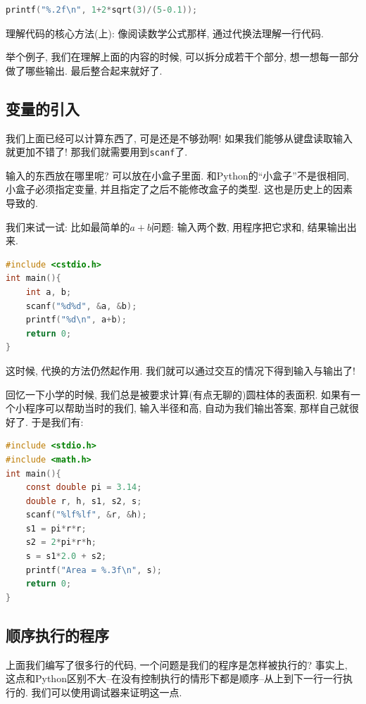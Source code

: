 \begin{lstlisting}[language=c]
	printf("%.2f\n", 1+2*sqrt(3)/(5-0.1)); 
\end{lstlisting}


\begin{idea}
	理解代码的核心方法(上): 像阅读数学公式那样, 通过代换法理解一行代码. 
	
	举个例子, 我们在理解上面的内容的时候, 可以拆分成若干个部分, 想一想每一部分做了哪些输出. 最后整合起来就好了. 
	
\end{idea}

\subsection{变量的引入}

我们上面已经可以计算东西了, 可是还是不够劲啊! 如果我们能够从键盘读取输入就更加不错了! 那我们就需要用到\texttt{scanf}了. 

输入的东西放在哪里呢? 可以放在小盒子里面. 和Python的``小盒子''不是很相同, 小盒子必须指定变量, 并且指定了之后不能修改盒子的类型. 这也是历史上的因素导致的. 

我们来试一试: 比如最简单的$a+b$问题: 输入两个数, 用程序把它求和, 结果输出出来. 

\begin{lstlisting}[language=c]
#include <cstdio.h>
int main(){
	int a, b;
	scanf("%d%d", &a, &b);
	printf("%d\n", a+b);
	return 0;
}
\end{lstlisting} 

这时候, 代换的方法仍然起作用. 我们就可以通过交互的情况下得到输入与输出了! 

回忆一下小学的时候, 我们总是被要求计算(有点无聊的)圆柱体的表面积. 如果有一个小程序可以帮助当时的我们, 输入半径和高, 自动为我们输出答案, 那样自己就很好了. 于是我们有: 

\begin{lstlisting}[language=c]
#include <stdio.h>
#include <math.h>
int main(){
	const double pi = 3.14;
	double r, h, s1, s2, s;
	scanf("%lf%lf", &r, &h);
	s1 = pi*r*r;
	s2 = 2*pi*r*h;
	s = s1*2.0 + s2;
	printf("Area = %.3f\n", s);
	return 0;
}	
\end{lstlisting}

\subsection{顺序执行的程序}

上面我们编写了很多行的代码, 一个问题是我们的程序是怎样被执行的? 事实上, 这点和Python区别不大--在没有控制执行的情形下都是顺序--从上到下一行一行执行的. 我们可以使用调试器来证明这一点. 

